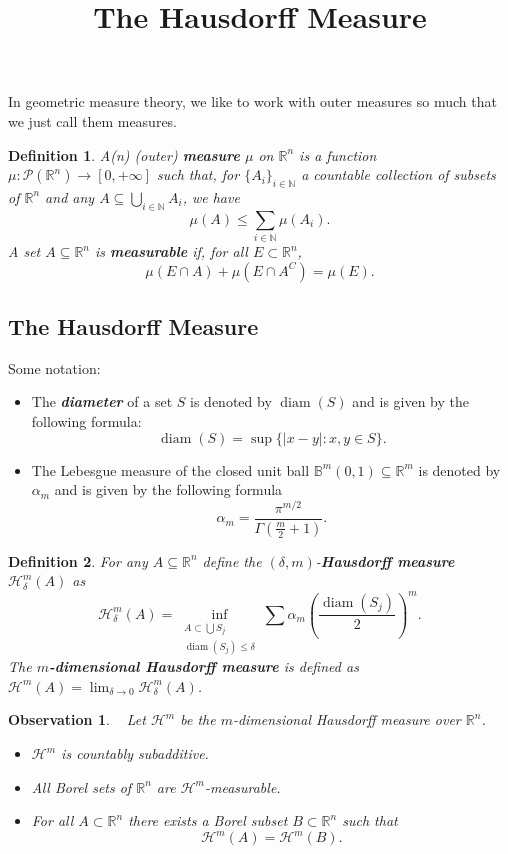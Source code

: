\documentclass[10pt]{article}
\title{\textbf{The Hausdorff Measure}}
\date{}
\theoremstyle{plain}
\newtheorem{definition}{Definition}
\newtheorem{observation}{Observation}
\DeclareMathOperator{\diam}{diam}
\begin{document}
	\maketitle 
	
In geometric measure theory, we like to work with outer measures so much that we just call them measures. 
	\begin{definition}
		A(n) (outer) \textbf{\textit{measure}} $\mu$ on $\mathbb{R}^n$ is a function $\mu: \mathcal{P}(\mathbb{R}^n) \to [0, + \infty]$ such that, for $\{A_i\}_{i \in \mathbb{N}}$ a countable collection of subsets of $\mathbb{R}^n$ and any $A \subseteq \bigcup_{i \in \mathbb{N}} A_i$, we have $$\mu(A) \leq \sum_{i \in \mathbb{N}} \mu(A_i).$$ A set $A \subseteq \mathbb{R}^n$ is \textbf{\textit{measurable}} if, for all $E \subset \mathbb{R}^n$, $$\mu(E \cap A) + \mu(E \cap A^C) = \mu(E).$$
	\end{definition}

	
\subsection*{The Hausdorff Measure}
	Some notation:	
		\begin{itemize}
			\item The \textbf{\textit{diameter}} of a set $S$ is denoted by $\diam(S)$ and is given by the following formula: $$\diam(S) = \sup \{|x - y| : x, y \in S\}.$$ 
			
			\item The Lebesgue measure of the closed unit ball $\mathbb{B}^m(0, 1) \subseteq \mathbb{R}^m$ is denoted by $\alpha_m$ and is given by the following formula $$\alpha_m = \frac{\pi^{m/2}}{\Gamma\left(\frac{m}{2} + 1\right)}.$$ 
		\end{itemize}
	\begin{definition}
		For any $A \subseteq \mathbb{R}^n$ define the $(\delta, m)$-\textbf{\textit{Hausdorff measure}} $\mathcal{H}_\delta^m(A)$ as $$\mathcal{H}_\delta^m(A) = \inf_{\substack{A \subset \bigcup S_j \\ \diam(S_j) \leq \delta}} \sum \alpha_m \left(\frac{\diam(S_j)}{2}\right)^m.$$ The \textbf{\textit{$m$-dimensional Hausdorff measure}} is defined as $\mathcal{H}^m(A) = \lim_{\delta \to 0} \mathcal{H}_{\delta}^m(A)$. 
	\end{definition}
	
	\newpage 
	\begin{observation} ~
		Let $\mathcal{H}^m$ be the $m$-dimensional Hausdorff measure over $\mathbb{R}^n$. 
			\begin{itemize}
				\item[(1)] $\mathcal{H}^m$ is countably subadditive. 
				
				\item[(2)] All Borel sets of $\mathbb{R}^n$ are $\mathcal{H}^m$-measurable. 
				
				\item[(3)] For all $A \subset \mathbb{R}^n$ there exists a Borel subset $B \subset \mathbb{R}^n$ such that $$\mathcal{H}^m(A) = \mathcal{H}^m(B).$$
			\end{itemize}
	\end{observation}
\end{document}
